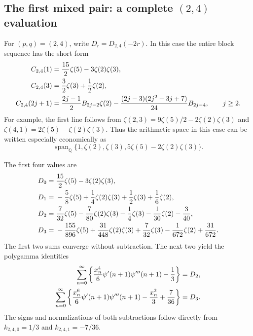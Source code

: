 \documentclass[11pt,a4paper]{article}
\numberwithin{equation}{section}
\theoremstyle{definition}
\theoremstyle{remark}
\begin{document}
\subsection{The first mixed pair: a complete \texorpdfstring{$(2,4)$}{(2,4)} evaluation}

For \((p,q)=(2,4)\), write \(D_r=D_{2,4}(-2r)\). In this case
the entire block sequence has the short form
\begin{align}\label{tail:24-blocks}
 C_{2,4}(1)&=\frac{15}{2}\zeta(5)-3\zeta(2)\zeta(3),\notag\\
 C_{2,4}(3)&=\frac32\zeta(3)+\frac12\zeta(2),\notag\\
 C_{2,4}(2j+1)&=\frac{2j-1}{2}B_{2j-2}\zeta(2)
  -\frac{(2j-3)(2j^2-3j+7)}{24}B_{2j-4},\qquad j\ge2.
\end{align}
For example, the first line follows from
\(\zeta(2,3)=9\zeta(5)/2-2\zeta(2)\zeta(3)\) and
\(\zeta(4,1)=2\zeta(5)-\zeta(2)\zeta(3)\). Thus the arithmetic
space in this case can be written especially economically as
\begin{equation}\label{tail:24-space}
 \operatorname{span}_{\mathbb Q}
 \{1,\zeta(2),\zeta(3),5\zeta(5)-2\zeta(2)\zeta(3)\}.
\end{equation}

The first four values are
\begin{align}\label{tail:24-values}
 D_0={}&\frac{15}{2}\zeta(5)-3\zeta(2)\zeta(3),\notag\\
 D_1={}&-\frac58\zeta(5)+\frac14\zeta(2)\zeta(3)
                    +\frac12\zeta(3)+\frac16\zeta(2),\notag\\
 D_2={}&\frac7{32}\zeta(5)-\frac7{80}\zeta(2)\zeta(3)
              -\frac14\zeta(3)-\frac1{30}\zeta(2)-\frac3{40},\notag\\
 D_3={}&-\frac{155}{896}\zeta(5)+\frac{31}{448}\zeta(2)\zeta(3)
              +\frac7{32}\zeta(3)-\frac1{672}\zeta(2)+\frac{31}{672}.
\end{align}
The first two sums converge without subtraction. The next two yield
the polygamma identities
\begin{align}\label{tail:24-polygamma-sums}
 \sum_{n=0}^{\infty}
 \left\{\frac{x_n^4}{6}\psi'(n+1)\psi'''(n+1)-\frac13\right\}
       &=D_2,\notag\\
 \sum_{n=0}^{\infty}
 \left\{\frac{x_n^6}{6}\psi'(n+1)\psi'''(n+1)
                   -\frac{x_n^2}{3}+\frac7{36}\right\}
       &=D_3.
\end{align}
The signs and normalizations of both subtractions follow directly
from \(k_{2,4,0}=1/3\) and \(k_{2,4,1}=-7/36\).
\end{document}
